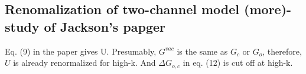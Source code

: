 \subsection{Renomalization of two-channel model (more)-study of Jackson's papger\cite{JacksonNarrow}}
Eq. (9) in the paper \cite{JacksonNarrow} gives U.  Presumably,  $G^{vac}$ is the same as $G_c$ or $G_o$, therefore, $U$ is already renormalized for high-k. And $\Delta{G_{o,c}}$ in eq. (12) is cut off at high-k. 